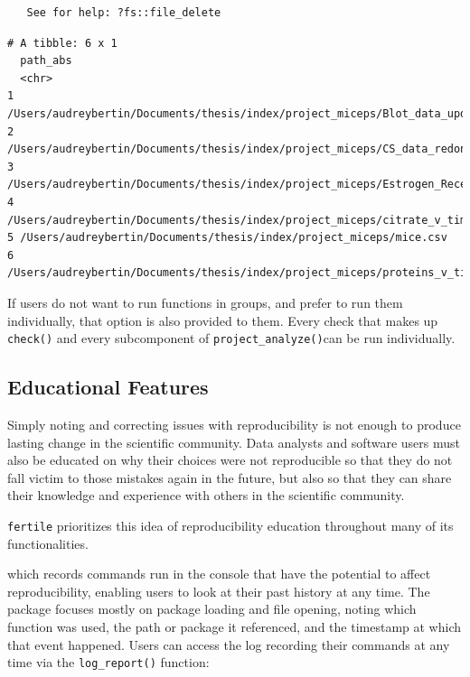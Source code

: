 \documentclass[12pt,twoside]{reedthesis}
\begin{document}
\begin{verbatim}
   See for help: ?fs::file_delete
\end{verbatim}
\begin{verbatim}
# A tibble: 6 x 1
  path_abs                                                                      
  <chr>                                                                         
1 /Users/audreybertin/Documents/thesis/index/project_miceps/Blot_data_updated.c~
2 /Users/audreybertin/Documents/thesis/index/project_miceps/CS_data_redone.csv  
3 /Users/audreybertin/Documents/thesis/index/project_miceps/Estrogen_Receptors.~
4 /Users/audreybertin/Documents/thesis/index/project_miceps/citrate_v_time.png  
5 /Users/audreybertin/Documents/thesis/index/project_miceps/mice.csv            
6 /Users/audreybertin/Documents/thesis/index/project_miceps/proteins_v_time.png 
\end{verbatim}
If users do not want to run functions in groups, and prefer to run them
individually, that option is also provided to them. Every check that
makes up \texttt{check()} and every subcomponent of
\texttt{project\_analyze()}can be run individually.

\subsection{Educational Features}\label{educational-features}

Simply noting and correcting issues with reproducibility is not enough
to produce lasting change in the scientific community. Data analysts and
software users must also be educated on why their choices were not
reproducible so that they do not fall victim to those mistakes again in
the future, but also so that they can share their knowledge and
experience with others in the scientific community.

\texttt{fertile} prioritizes this idea of reproducibility education
throughout many of its functionalities.

which records commands run in the console that have the potential to
affect reproducibility, enabling users to look at their past history at
any time. The package focuses mostly on package loading and file
opening, noting which function was used, the path or package it
referenced, and the timestamp at which that event happened. Users can
access the log recording their commands at any time via the
\texttt{log\_report()} function:
\end{document}
